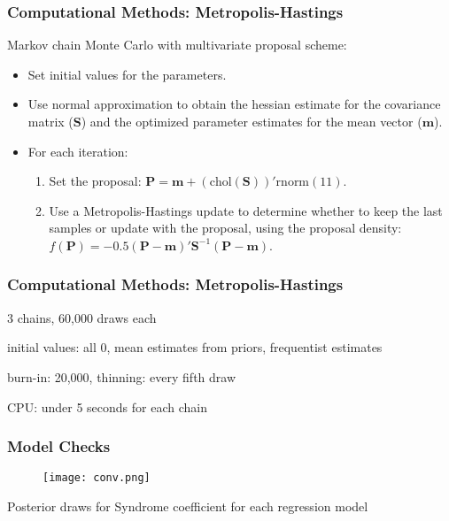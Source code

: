\documentclass{beamer}
\begin{document}
\begin{frame}
\frametitle{Computational Methods: Metropolis-Hastings}
Markov chain Monte Carlo with multivariate proposal scheme:
\begin{itemize}
\item Set initial values for the parameters.
\item Use normal approximation to obtain the hessian estimate for the covariance matrix ($\mathbf{S}$) and the optimized parameter estimates for the mean vector ($\mathbf{m}$).
\item For each iteration: 
\begin{enumerate}
\item Set the proposal: $\mathbf{P} = \mathbf{m} + (\text{chol}(\mathbf{S}))'\text{rnorm}(11)$.
\item Use a Metropolis-Hastings update to determine whether to keep the last samples or update with the proposal, using the proposal density: $f(\mathbf{P}) = -0.5(\mathbf{P}-\mathbf{m})'\mathbf{S}^{-1}(\mathbf{P}-\mathbf{m})$.
\end{enumerate}
\end{itemize}
\end{frame}

\begin{frame}
\frametitle{Computational Methods: Metropolis-Hastings}
\itemize
\item 3 chains, 60,000 draws each
\item initial values: all 0, mean estimates from priors, frequentist estimates
\item burn-in: 20,000, thinning: every fifth draw
\item CPU: under 5 seconds for each chain
\end{frame}

\begin{frame}
\frametitle{Model Checks}
\begin{figure}
\centering
\texttt{[image: conv.png]}
\label{fig:diagSyn}
\end{figure}
Posterior draws for Syndrome coefficient for each regression model
\end{frame}
\end{document}
